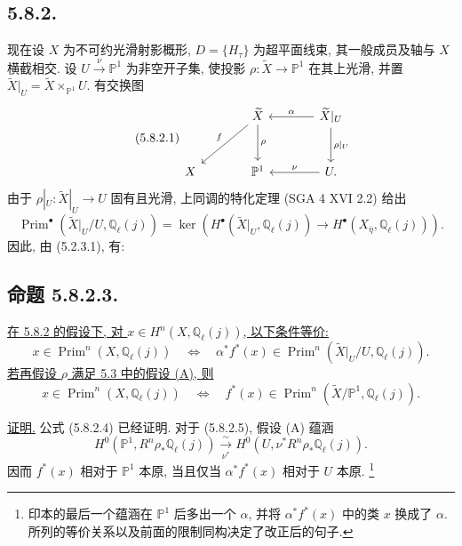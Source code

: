 \subsection*{5.8.2.}
现在设 $X$ 为不可约光滑射影概形, $D=\{H_\tau\}$ 为超平面线束, 其一般成员及轴与 $X$ 横截相交. 设 $U\xrightarrow{\nu}\mathbb P^1$ 为非空开子集, 使投影 $\rho:\widetilde X\to\mathbb P^1$ 在其上光滑, 并置 $\widetilde X|_U=\widetilde X\times_{\mathbb P^1}U$. 有交换图
\begin{equation}\tag{5.8.2.1}
\begin{tikzcd}[column sep=large,row sep=large]
{}
&
\widetilde X
  \arrow[dl,"f"']
  \arrow[d,"\rho"]
&
\widetilde X|_U
  \arrow[l,"\alpha"']
  \arrow[d,"\rho|_U"]
\\
X
&
\mathbb P^1
&
U\arrow[l,"\nu"'].
\end{tikzcd}
\end{equation}
由于 $\rho|_U:\widetilde X|_U\to U$ 固有且光滑, 上同调的特化定理 (SGA 4 XVI 2.2) 给出
\begin{equation}\tag{5.8.2.2}
\operatorname{Prim}^\bullet(\widetilde X|_U/U,\mathbb Q_\ell(j))
=\ker\!\left(
H^\bullet(\widetilde X|_U,\mathbb Q_\ell(j))
\longrightarrow H^\bullet(X_{\bar\eta},\mathbb Q_\ell(j))
\right).
\end{equation}
因此, 由 (5.2.3.1), 有:

\subsection*{命题 5.8.2.3.}
\underline{在 5.8.2 的假设下, 对 $x\in H^n(X,\mathbb Q_\ell(j))$, 以下条件等价:}
\begin{equation}\tag{5.8.2.4}
x\in\operatorname{Prim}^n(X,\mathbb Q_\ell(j))
\quad\Longleftrightarrow\quad
\alpha^*f^*(x)\in
\operatorname{Prim}^n(\widetilde X|_U/U,\mathbb Q_\ell(j)).
\end{equation}
\underline{若再假设 $\rho$ 满足 5.3 中的假设 (A), 则}
\begin{equation}\tag{5.8.2.5}
x\in\operatorname{Prim}^n(X,\mathbb Q_\ell(j))
\quad\Longleftrightarrow\quad
f^*(x)\in
\operatorname{Prim}^n(\widetilde X/\mathbb P^1,\mathbb Q_\ell(j)).
\end{equation}

\underline{证明.}
公式 (5.8.2.4) 已经证明. 对于 (5.8.2.5), 假设 (A) 蕴涵
\[
H^0(\mathbb P^1,R^n\rho_*\mathbb Q_\ell(j))
\xrightarrow[\nu^*]{\sim}
H^0(U,\nu^*R^n\rho_*\mathbb Q_\ell(j)).
\]
因而 $f^*(x)$ 相对于 $\mathbb P^1$ 本原, 当且仅当 $\alpha^*f^*(x)$ 相对于 $U$ 本原.
\footnote{印本的最后一个蕴涵在 $\mathbb P^1$ 后多出一个 $\alpha$, 并将 $\alpha^*f^*(x)$ 中的类 $x$ 换成了 $\alpha$. 所列的等价关系以及前面的限制同构决定了改正后的句子.}

